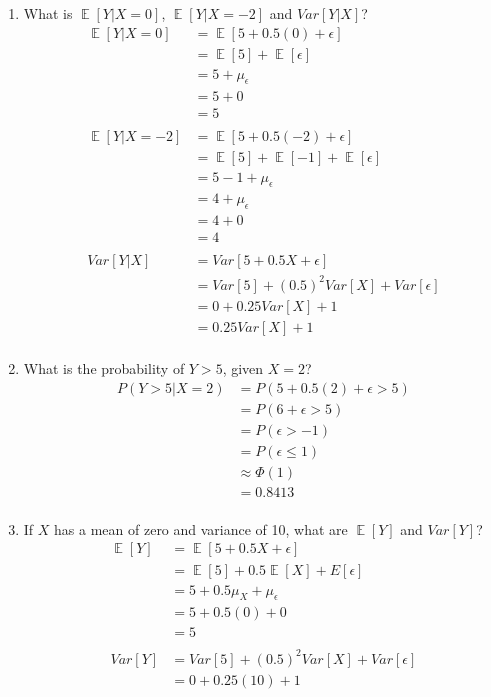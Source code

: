 \documentclass{article}
\DeclareMathOperator{\E}{\mathbb{E}}
\begin{document}
\begin{enumerate}
\item What is $\E[Y|X = 0]$, $\E[Y|X = -2]$ and $Var[Y|X]$?
\begin{align*}
\E[Y|X = 0] &= \E[5 + 0.5(0) + \epsilon]\\
&= \E[5] + \E[\epsilon]\\
&= 5 + \mu_{\epsilon}\\
&= 5 + 0\\
&= 5\\
\\
\E[Y|X = -2] &= \E[5 + 0.5(-2) + \epsilon]\\
&= \E[5] + \E[-1] + \E[\epsilon]\\
&= 5 - 1 + \mu_{\epsilon}\\
&= 4 + \mu_{\epsilon}\\
&= 4 + 0\\
&= 4\\
\\
Var[Y|X] &= Var[5 + 0.5X + \epsilon]\\
&= Var[5] + (0.5) ^ 2 Var[X] + Var[\epsilon]\\
&= 0 + 0.25 Var[X] + 1\\
&= 0.25 Var[X] + 1\\
\end{align*}
\item What is the probability of $Y > 5$, given $X = 2$?
\begin{align*}
P(Y > 5 | X = 2) &= P(5 + 0.5(2) + \epsilon > 5)\\
&= P(6 + \epsilon > 5)\\
&= P(\epsilon > -1)\\
&= P(\epsilon \leq 1)\\
&\approx \Phi(1)\\
&= 0.8413\\
\end{align*}
\item If $X$ has a mean of zero and variance of 10, what are $\E[Y]$ and $Var[Y]$?
\begin{align*}
\E[Y] &= \E[5 + 0.5X + \epsilon]\\
&= \E[5] + 0.5\E[X] + E[\epsilon]\\
&= 5 + 0.5\mu_X + \mu_{\epsilon}\\
&= 5 + 0.5(0) + 0\\
&= 5\\
\\
Var[Y] &= Var[5] + (0.5) ^ 2 Var[X] + Var[\epsilon]\\
&= 0 + 0.25(10) + 1\\

\end{align*}
\end{enumerate}
\end{document}
